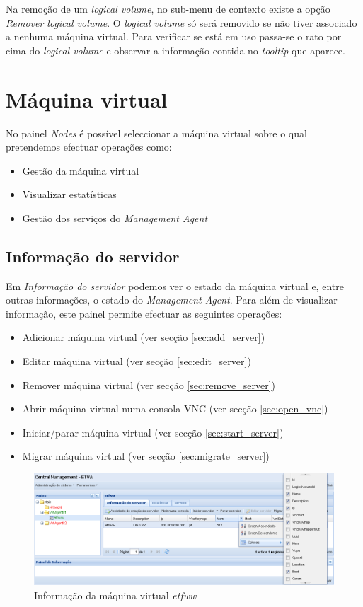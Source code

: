 Na remoção de um \emph{logical volume}, no sub-menu de contexto existe a opção \emph{Remover logical volume}. O \emph{logical volume} só será removido se não tiver associado a nenhuma máquina virtual. Para verificar se está em uso passa-se o rato por cima do \emph{logical volume} e observar a informação contida no \emph{tooltip} que aparece.

\pagebreak

\section{Máquina virtual}
\label{sec:server}

No painel \emph{Nodes} é possível seleccionar a máquina virtual sobre o qual pretendemos efectuar operações como:

\begin{itemize}
        \item Gestão da máquina virtual
        \item Visualizar estatísticas        
        \item Gestão dos serviços do \emph{Management Agent}
\end{itemize}

\subsection{Informação do servidor}
Em \emph{Informação do servidor} podemos ver o estado da máquina virtual e, entre outras informações, o estado do \emph{Management Agent}.
Para além de visualizar informação, este painel permite efectuar as seguintes operações:
\begin{itemize}
	\item Adicionar máquina virtual (ver secção \ref{sec:add_server})
    \item Editar máquina virtual (ver secção \ref{sec:edit_server})
	\item Remover máquina virtual (ver secção \ref{sec:remove_server})
	\item Abrir máquina virtual numa consola VNC (ver secção \ref{sec:open_vnc})
	\item Iniciar/parar máquina virtual (ver secção \ref{sec:start_server})
    \item Migrar máquina virtual (ver secção \ref{sec:migrate_server})
\end{itemize}

\begin{figure}[H]
	\begin{center}
	\includegraphics[scale=0.45]{screenshots/server_info.png}
	\caption{Informação da máquina virtual \emph{etfww}}
	\label{fig:server_info}
	\end{center}
\end{figure}

